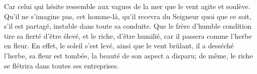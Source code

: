 Car celui qui hésite ressemble aux vagues de la mer
	que le vent agite et soulève.
Qu’il ne s’imagine pas, cet homme-là,
	qu’il recevra du Seigneur quoi que ce soit,
	s’il est partagé, instable dans toute sa conduite.
Que le frère d’humble condition tire sa fierté d’être élevé,
	et le riche, d’être humilié, car il passera comme l’herbe en fleur.
En effet, le soleil s’est levé, ainsi que le vent brûlant,
	il a desséché l’herbe, sa fleur est tombée,
	la beauté de son aspect a disparu;
	de même, le riche se flétrira dans toutes ses entreprises.
